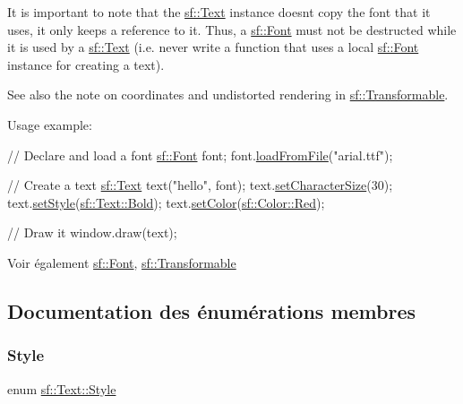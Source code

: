 It is important to note that the \hyperlink{classsf_1_1Text}{sf\+::\+Text} instance doesn\textquotesingle{}t copy the font that it uses, it only keeps a reference to it. Thus, a \hyperlink{classsf_1_1Font}{sf\+::\+Font} must not be destructed while it is used by a \hyperlink{classsf_1_1Text}{sf\+::\+Text} (i.\+e. never write a function that uses a local \hyperlink{classsf_1_1Font}{sf\+::\+Font} instance for creating a text).

See also the note on coordinates and undistorted rendering in \hyperlink{classsf_1_1Transformable}{sf\+::\+Transformable}.

Usage example\+: 
\begin{DoxyCode}
\textcolor{comment}{// Declare and load a font}
\hyperlink{classsf_1_1Font}{sf::Font} font;
font.\hyperlink{classsf_1_1Font_ab020052ef4e01f6c749a85571c0f3fd1}{loadFromFile}(\textcolor{stringliteral}{"arial.ttf"});

\textcolor{comment}{// Create a text}
\hyperlink{classsf_1_1Text}{sf::Text} text(\textcolor{stringliteral}{"hello"}, font);
text.\hyperlink{classsf_1_1Text_ae96f835fc1bff858f8a23c5b01eaaf7e}{setCharacterSize}(30);
text.\hyperlink{classsf_1_1Text_ad791702bc2d1b6590a1719aa60635edf}{setStyle}(\hyperlink{classsf_1_1Text_aa8add4aef484c6e6b20faff07452bd82af1b47f98fb1e10509ba930a596987171}{sf::Text::Bold});
text.\hyperlink{classsf_1_1Text_afd1742fca1adb6b0ea98357250ffb634}{setColor}(\hyperlink{classsf_1_1Color_a127dbf55db9c07d0fa8f4bfcbb97594a}{sf::Color::Red});

\textcolor{comment}{// Draw it}
window.draw(text);
\end{DoxyCode}


\begin{DoxySeeAlso}{Voir également}
\hyperlink{classsf_1_1Font}{sf\+::\+Font}, \hyperlink{classsf_1_1Transformable}{sf\+::\+Transformable} 
\end{DoxySeeAlso}


\subsection{Documentation des énumérations membres}
\mbox{\label{classsf_1_1Text_aa8add4aef484c6e6b20faff07452bd82}} 
\subsubsection{\texorpdfstring{Style}{Style}}
{\footnotesize\ttfamily enum \hyperlink{classsf_1_1Text_aa8add4aef484c6e6b20faff07452bd82}{sf\+::\+Text\+::\+Style}}



